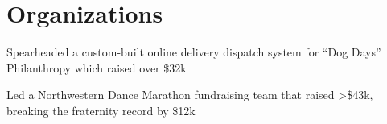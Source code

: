 
\section{Organizations}

\begin{listitems}
\item Spearheaded a custom-built online delivery dispatch system for ``Dog Days'' Philanthropy which raised over \$32k
\item Led a Northwestern Dance Marathon fundraising team that raised >\$43k, breaking the fraternity record by \$12k
\end{listitems}
\sectionsep

\sectionsep

